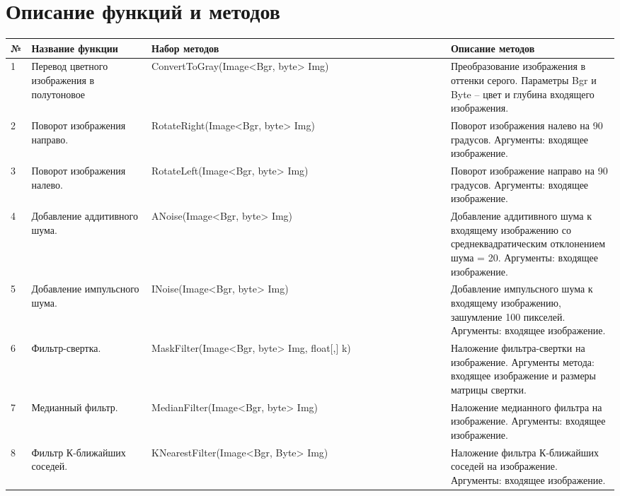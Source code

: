 \documentclass[a4paper,12pt]{article}
\begin{document}
\section{Описание функций и методов}
\begin{tabular}{|p{0.025\linewidth}|p{0.2\linewidth}|p{0.5\linewidth}|p{0.3\linewidth}|}
\hline
№ & Название функции & Набор методов & Описание методов\\
\hline
1&Перевод цветного изображения в полутоновое&ConvertToGray(Image<Bgr, byte> Img)&Преобразование изображения в оттенки серого. Параметры Bgr и Byte – цвет и глубина входящего изображения.\\
\hline
2&Поворот изображения направо.&RotateRight(Image<Bgr, byte> Img)&Поворот изображения налево на 90 градусов. Аргументы: входящее изображение.\\ \hline
3&Поворот изображения налево.&RotateLeft(Image<Bgr, byte> Img)&Поворот изображение направо на 90 градусов. Аргументы: входящее изображение.\\ \hline
4&Добавление аддитивного шума.&ANoise(Image<Bgr, byte> Img)&Добавление аддитивного шума к входящему изображению со среднеквадратическим отклонением шума = 20. Аргументы: входящее изображение.\\ \hline
5&Добавление импульсного шума.&INoise(Image<Bgr, byte> Img)&Добавление импульсного шума к входящему изображению, зашумление 100 пикселей. Аргументы: входящее изображение.\\ \hline
6&Фильтр-свертка.&MaskFilter(Image<Bgr, byte> Img, float[,] k)&Наложение фильтра-свертки на изображение. Аргументы метода: входящее изображение и размеры матрицы свертки.\\ \hline
7&Медианный фильтр.&MedianFilter(Image<Bgr, byte> Img)&Наложение медианного фильтра на изображение. Аргументы: входящее изображение.\\ \hline
8&Фильтр К-ближайших соседей.&KNearestFilter(Image<Bgr, Byte> Img)&Наложение фильтра К-ближайших соседей на изображение. Аргументы: входящее изображение.\\ \hline
\end{tabular}
\newpage
\end{document}
